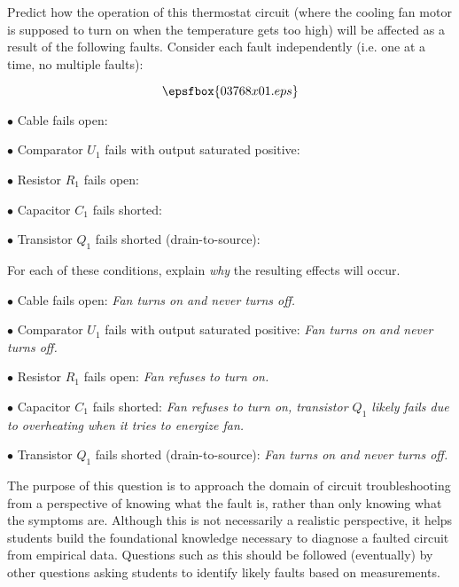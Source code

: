 

Predict how the operation of this thermostat circuit (where the cooling fan motor is supposed to turn on when the temperature gets too high) will be affected as a result of the following faults.  Consider each fault independently (i.e. one at a time, no multiple faults):

$$\epsfbox{03768x01.eps}$$

\medskip
\item{$\bullet$} Cable fails open:
\vskip 5pt
\item{$\bullet$} Comparator $U_1$ fails with output saturated positive:
\vskip 5pt
\item{$\bullet$} Resistor $R_1$ fails open:
\vskip 5pt
\item{$\bullet$} Capacitor $C_1$ fails shorted:
\vskip 5pt
\item{$\bullet$} Transistor $Q_1$ fails shorted (drain-to-source):
\medskip

For each of these conditions, explain {\it why} the resulting effects will occur.







\medskip
\item{$\bullet$} Cable fails open: {\it Fan turns on and never turns off.}
\vskip 5pt
\item{$\bullet$} Comparator $U_1$ fails with output saturated positive: {\it Fan turns on and never turns off.}
\vskip 5pt
\item{$\bullet$} Resistor $R_1$ fails open: {\it Fan refuses to turn on.}
\vskip 5pt
\item{$\bullet$} Capacitor $C_1$ fails shorted: {\it Fan refuses to turn on, transistor $Q_1$ likely fails due to overheating when it tries to energize fan.}
\vskip 5pt
\item{$\bullet$} Transistor $Q_1$ fails shorted (drain-to-source): {\it Fan turns on and never turns off.}
\medskip







The purpose of this question is to approach the domain of circuit troubleshooting from a perspective of knowing what the fault is, rather than only knowing what the symptoms are.  Although this is not necessarily a realistic perspective, it helps students build the foundational knowledge necessary to diagnose a faulted circuit from empirical data.  Questions such as this should be followed (eventually) by other questions asking students to identify likely faults based on measurements.





